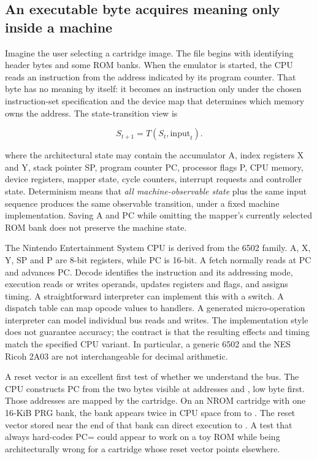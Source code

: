 \subsection{An executable byte acquires meaning only inside a machine}\label{06-engine-ii-ch042-an-executable-byte-acquires-meaning-only-inside-a-machine}

\hypertarget{06-engine-ii-ch042-an-executable-byte-acquires-meaning-only-inside-a-machine}{}

Imagine the user selecting a cartridge image. The file begins with identifying header bytes and some ROM banks. When the emulator is started, the CPU reads an instruction from the address indicated by its program counter. That byte has no meaning by itself: it becomes an instruction only under the chosen instruction-set specification and the device map that determines which memory owns the address. The state-transition view is

\[
S_{t+1}=T(S_t,\mathrm{input}_t).
\]

where the architectural state may contain the accumulator A, index registers X and Y, stack pointer SP, program counter PC, processor flags P, CPU memory, device registers, mapper state, cycle counters, interrupt requests and controller state. Determinism means that \emph{all machine-observable state} plus the same input sequence produces the same observable transition, under a fixed machine implementation. Saving A and PC while omitting the mapper's currently selected ROM bank does not preserve the machine state.

The Nintendo Entertainment System CPU is derived from the 6502 family. A, X, Y, SP and P are 8-bit registers, while PC is 16-bit. A fetch normally reads at PC and advances PC. Decode identifies the instruction and its addressing mode, execution reads or writes operands, updates registers and flags, and assigns timing. A straightforward interpreter can implement this with a switch. A dispatch table can map opcode values to handlers. A generated micro-operation interpreter can model individual bus reads and writes. The implementation style does not guarantee accuracy; the contract is that the resulting effects and timing match the specified CPU variant. In particular, a generic 6502 and the NES Ricoh 2A03 are not interchangeable for decimal arithmetic.

A reset vector is an excellent first test of whether we understand the bus. The CPU constructs PC from the two bytes visible at addresses  and , low byte first. Those addresses are mapped by the cartridge. On an NROM cartridge with one 16-KiB PRG bank, the bank appears twice in CPU space from  to . The reset vector stored near the end of that bank can direct execution to . A test that always hard-codes PC= could appear to work on a toy ROM while being architecturally wrong for a cartridge whose reset vector points elsewhere.

